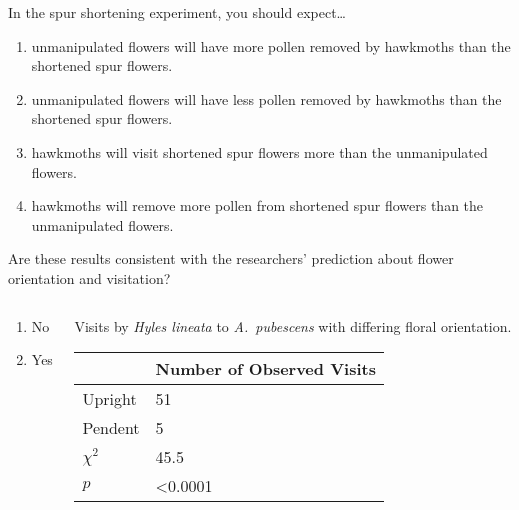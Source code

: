 \documentclass[t,hidelinks]{beamer}
\newcommand{\ques}[1]{\highlight{\textsc{q#1:}}}
\begin{document}
%
\begin{frame}[t]{\ques{10} In the spur shortening experiment, you should expect\dots}
	\begin{enumerate}
		\item \alert<2>{unmanipulated flowers will have more pollen removed by hawkmoths than the shortened spur flowers.}
		\item unmanipulated  flowers will have less pollen removed by hawkmoths than the shortened spur flowers.
		\item hawkmoths will visit shortened spur flowers more than the unmanipulated flowers.
		\item hawkmoths will remove more pollen from shortened spur flowers than the unmanipulated flowers.
	\end{enumerate}

\end{frame}
%
\begin{frame}[t]{\ques{11} Are these results consistent with the researchers’ prediction about flower orientation and visitation?}
	
	\begin{columns}[t]
		\begin{column}{0.28\textwidth}
			\begin{enumerate}
				\item No
				\item Yes
			\end{enumerate}
		\end{column}
		\begin{column}{0.5\textwidth}
	Visits by \textit{Hyles lineata} to \textit{A.~pubescens} with differing floral orientation.
	
	\begin{tabular}{L{0.6in}R{1in}}
		\toprule
		& Number of Observed Visits \tabularnewline
		\midrule
		Upright		&	51	 \tabularnewline
		Pendent		&	5	 \tabularnewline
		$\chi^2$	&	45.5 \tabularnewline
		$p$			&  \textless0.0001 \tabularnewline
		\bottomrule
	\end{tabular}
\end{column}
	\end{columns}
\end{frame}
%
\end{document}
